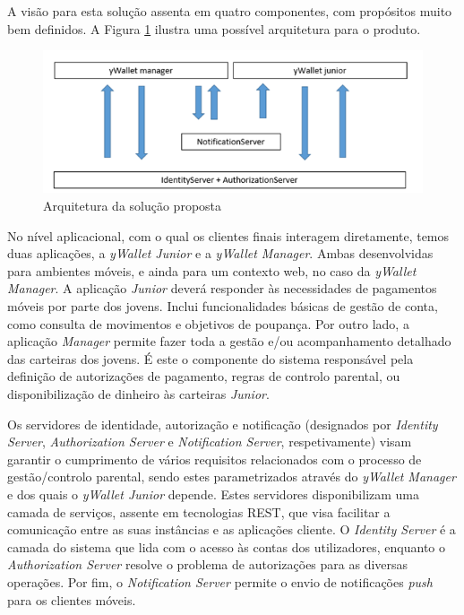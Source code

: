 \documentclass{article}
\begin{document}
      A visão para esta solução assenta em quatro componentes, com propósitos muito bem definidos. A Figura \ref{img1} ilustra uma possível arquitetura para o produto.

      \begin{figure}[ht!]
        \centering
          \includegraphics[width=0.7\linewidth]{img/img1}
          \caption{Arquitetura da solução proposta}
          \label{img1}
      \end{figure}

      No nível aplicacional, com o qual os clientes finais interagem diretamente, temos duas aplicações, a \emph{yWallet Junior} e a \emph{yWallet Manager}. Ambas desenvolvidas para ambientes móveis, e ainda para um contexto web, no caso da \emph{yWallet Manager}. A aplicação \emph{Junior} deverá responder às necessidades de pagamentos móveis por parte dos jovens. Inclui funcionalidades básicas de gestão de conta, como consulta de movimentos e objetivos de poupança. Por outro lado, a aplicação \emph{Manager} permite fazer toda a gestão e/ou acompanhamento detalhado das carteiras dos jovens. É este o componente do sistema responsável pela definição de autorizações de pagamento, regras de controlo parental, ou disponibilização de dinheiro às carteiras \emph{Junior}.

      Os servidores de identidade, autorização e notificação (designados por \emph{Identity Server}, \emph{Authorization Server} e \emph{Notification Server}, respetivamente) visam garantir o cumprimento de vários requisitos relacionados com o processo de gestão/controlo parental, sendo estes parametrizados através do \emph{yWallet Manager} e dos quais o \emph{yWallet Junior} depende. Estes servidores disponibilizam uma camada de serviços, assente em tecnologias REST, que visa facilitar a comunicação entre as suas instâncias e as aplicações cliente. O \emph{Identity Server} é a camada do sistema que lida com o acesso às contas dos utilizadores, enquanto o \emph{Authorization Server} resolve o problema de autorizações para as diversas operações. Por fim, o \emph{Notification Server} permite o envio de notificações \emph{push} para os clientes móveis.
\end{document}
